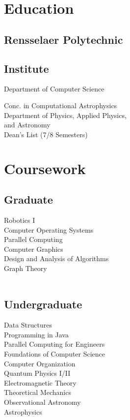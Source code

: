 \documentclass[letterpaper]{deedy-resume} %
\begin{document}
\begin{minipage}[t]{0.33\textwidth}
\section{Education} 

\subsection{Rensselaer Polytechnic}
\subsection{Institute}

Department of Computer Science\\

Conc. in Computational Astrophysics \\
Department of Physics, Applied Physics,\\
and Astronomy\\
Dean's List (7/8 Semesters) \\


\section{Coursework}

\subsection{Graduate}
Robotics I\\
Computer Operating Systems\\
Parallel Computing\\
Computer Graphics\\
Design and Analysis of Algorithms\\
Graph Theory\\~\\
\subsection{Undergraduate}
Data Structures\\
Programming in Java\\
Parallel Computing for Engineers\\
Foundations of Computer Science\\
Computer Organization\\
Quantum Physics I/II\\
Electromagnetic Theory\\
Theoretical Mechanics\\
Observational Astronomy\\
Astrophysics



\end{minipage}
\end{document}
